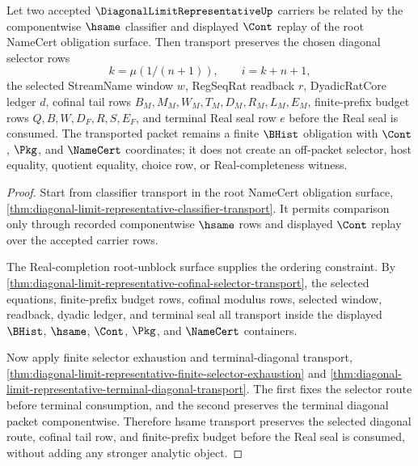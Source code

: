 \begin{theorem}\label{thm:diagonal-limit-representative-selector-transport}
Let two accepted $\DiagonalLimitRepresentativeUp$ carriers be related by the componentwise $\hsame$ classifier and displayed $\Cont$ replay of the root NameCert obligation surface. Then transport preserves the chosen diagonal selector rows
$$
k=\mu(1/(n+1)),\qquad i=k+n+1,
$$
the selected StreamName window $w$, RegSeqRat readback $r$, DyadicRatCore ledger $d$, cofinal tail rows $B_M,M_M,W_M,T_M,D_M,R_M,L_M,E_M$, finite-prefix budget rows $Q,B,W,D_F,R,S,E_F$, and terminal Real seal row $e$ before the Real seal is consumed. The transported packet remains a finite $\BHist$ obligation with $\Cont$, $\Pkg$, and $\NameCert$ coordinates; it does not create an off-packet selector, host equality, quotient equality, choice row, or Real-completeness witness.
\end{theorem}
\begin{proof}
Start from classifier transport in the root NameCert obligation surface, \autoref{thm:diagonal-limit-representative-classifier-transport}. It permits comparison only through recorded componentwise $\hsame$ rows and displayed $\Cont$ replay over the accepted carrier rows.

The Real-completion root-unblock surface supplies the ordering constraint. By \autoref{thm:diagonal-limit-representative-cofinal-selector-transport}, the selected equations, finite-prefix budget rows, cofinal modulus rows, selected window, readback, dyadic ledger, and terminal seal all transport inside the displayed $\BHist$, $\hsame$, $\Cont$, $\Pkg$, and $\NameCert$ containers.

Now apply finite selector exhaustion and terminal-diagonal transport, \autoref{thm:diagonal-limit-representative-finite-selector-exhaustion} and \autoref{thm:diagonal-limit-representative-terminal-diagonal-transport}. The first fixes the selector route before terminal consumption, and the second preserves the terminal diagonal packet componentwise. Therefore hsame transport preserves the selected diagonal route, cofinal tail row, and finite-prefix budget before the Real seal is consumed, without adding any stronger analytic object.
\end{proof}

